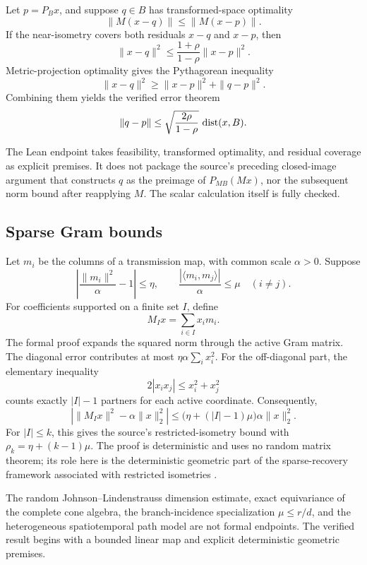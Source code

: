 \documentclass[11pt,a4paper]{article}
\begin{document}
Let \(p=P_Bx\), and suppose \(q\in B\) has transformed-space optimality
\[
  \|M(x-q)\|\leq\|M(x-p)\|.
\]
If the near-isometry covers both residuals \(x-q\) and \(x-p\), then
\[
  \|x-q\|^2
  \leq\frac{1+\rho}{1-\rho}\|x-p\|^2.
\]
Metric-projection optimality gives the Pythagorean inequality
\[
  \|x-q\|^2\geq
  \|x-p\|^2+\|q-p\|^2.
\]
Combining them yields the verified error theorem
\[
  \|q-p\|
  \leq
  \sqrt{\frac{2\rho}{1-\rho}}\,\operatorname{dist}(x,B).
\]

The Lean endpoint takes feasibility, transformed optimality, and residual
coverage as explicit premises. It does not package the source's preceding
closed-image argument that constructs \(q\) as the preimage of
\(P_{MB}(Mx)\), nor the subsequent norm bound after reapplying \(M\).
The scalar calculation itself is fully checked.

\subsection{Sparse Gram bounds}

Let \(m_i\) be the columns of a transmission map, with common scale
\(\alpha>0\). Suppose
\[
  \left|\frac{\|m_i\|^2}{\alpha}-1\right|\leq\eta,
  \qquad
  \frac{|\langle m_i,m_j\rangle|}{\alpha}\leq\mu
  \quad(i\neq j).
\]
For coefficients supported on a finite set \(I\), define
\[
  M_Ix=\sum_{i\in I}x_im_i.
\]
The formal proof expands the squared norm through the active Gram matrix.
The diagonal error contributes at most
\(\eta\alpha\sum_i x_i^2\). For the off-diagonal part, the elementary
inequality
\[
  2|x_ix_j|\leq x_i^2+x_j^2
\]
counts exactly \(|I|-1\) partners for each active coordinate. Consequently,
\[
  \left|
    \|M_Ix\|^2-\alpha\|x\|_2^2
  \right|
  \leq
  \bigl(\eta+(|I|-1)\mu\bigr)\alpha\|x\|_2^2.
\]
For \(|I|\leq k\), this gives the source's restricted-isometry bound with
\(\rho_k=\eta+(k-1)\mu\). The proof is deterministic and uses no random
matrix theorem; its role here is the deterministic geometric part of the
sparse-recovery framework associated with restricted isometries
\cite{candes2005}.

\begin{boundarybox}
The random Johnson--Lindenstrauss dimension estimate, exact equivariance of
the complete cone algebra, the branch-incidence specialization
\(\mu\leq r/d\), and the heterogeneous spatiotemporal path model are not
formal endpoints. The verified result begins with a bounded linear map and
explicit deterministic geometric premises.
\end{boundarybox}
\end{document}
